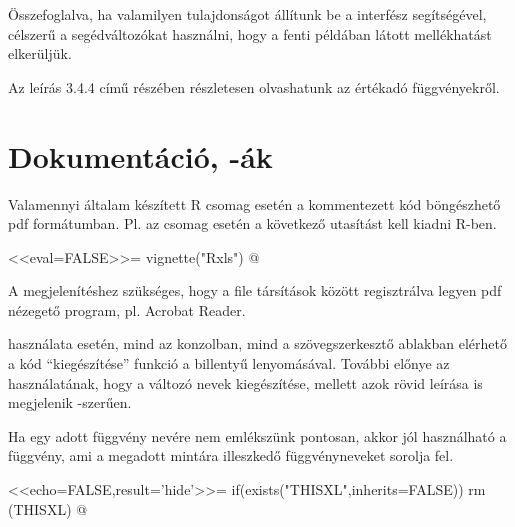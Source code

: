 Összefoglalva, ha valamilyen tulajdonságot állítunk be a  interfész
segítségével, célszerű a segédváltozókat használni, hogy a fenti
példában látott mellékhatást elkerüljük. 

Az  leírás 3.4.4 
című részében részletesen 
olvashatunk az értékadó függvényekről.


\section{Dokumentáció, -ák}\label{sec:7.3}
Valamennyi általam készített R csomag esetén a kommentezett kód
böngészhető pdf formátumban. Pl. az  csomag esetén a következő
utasítást kell kiadni R-ben. 
\begin{Rnw}
<<eval=FALSE>>=
vignette("Rxls")
@  
\end{Rnw}
A megjelenítéshez szükséges, hogy a file társítások között
regisztrálva legyen pdf nézegető program, pl. Acrobat Reader. 

 használata esetén, mind az  konzolban, mind a
szövegszerkesztő ablakban elérhető a kód ``kiegészítése'' funkció a
 billentyű lenyomásával. További előnye az  
használatának, hogy a változó nevek kiegészítése, mellett azok rövid
leírása is megjelenik -szerűen.

Ha egy adott  függvény nevére nem emlékszünk pontosan, akkor
jól használható a  függvény, ami a megadott mintára illeszkedő
függvényneveket sorolja fel. 

\begin{Rnw}
<<echo=FALSE,result='hide'>>=
if(exists("THISXL",inherits=FALSE)) rm (THISXL)
@  
\end{Rnw}



